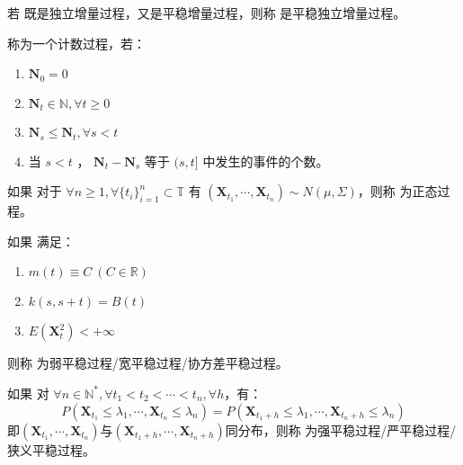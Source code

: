        \begin{definition}[平稳独立增量过程]
            若 \StochasticProcess 既是独立增量过程，又是平稳增量过程，则称 \StochasticProcess 是平稳独立增量过程。
        \end{definition}

        \begin{definition}[计数过程]
            \CountingProcess 称为一个计数过程，若：
            \begin{enumerate}[label=(\arabic*)]
                \item $\textbf{N}_0 = 0$
                \item $\textbf{N}_t \in \mathbb{N}, \forall t \geq 0$
                \item $\textbf{N}_s \leq \textbf{N}_t, \forall s < t$
                \item 当 $s < t$ ， $\textbf{N}_t - \textbf{N}_s$ 等于 $(s, t]$ 中发生的事件的个数。
            \end{enumerate}
        \end{definition}

        \begin{definition}[正态过程]
           如果 \StochasticProcess 对于 $ \forall n \geq 1, \forall \{ t_i \}_{i = 1}^{n} \subset \mathbb{T}$ 有 $\left( \textbf{X}_{t_1}, \cdots, \textbf{X}_{t_n}\right) \sim N(\mu, \Sigma)$，则称 \StochasticProcess 为正态过程。
        \end{definition}

        \begin{definition}
            如果 \StochasticProcess 满足：
            \begin{enumerate}[label=(\arabic*)]
                \item $m(t) \equiv C\ (C \in \mathbb{R})$
                \item $k(s, s+t) = B(t)$
                \item $ E\left( \textbf{X}_t^2 \right) < +\infty $
            \end{enumerate}
            则称 \StochasticProcess 为弱平稳过程/宽平稳过程/协方差平稳过程。
        \end{definition}

        \begin{definition}
            如果 \StochasticProcess 对 $\forall n \in \mathbb{N}^*, \forall t_1 < t_2 < \cdots < t_n, \forall h$，有：
            $$
            P\left( \textbf{X}_{t_1} \leq \lambda_1, \cdots, \textbf{X}_{t_n} \leq \lambda_n \right) = P\left( \textbf{X}_{t_1 + h} \leq \lambda_1, \cdots, \textbf{X}_{t_n + h} \leq \lambda_n \right)
            $$
            即$(\textbf{X}_{t_1}, \cdots, \textbf{X}_{t_n})$与$(\textbf{X}_{t_1 + h}, \cdots, \textbf{X}_{t_n + h})$同分布，则称 \StochasticProcess 为强平稳过程/严平稳过程/狭义平稳过程。
            
        \end{definition}